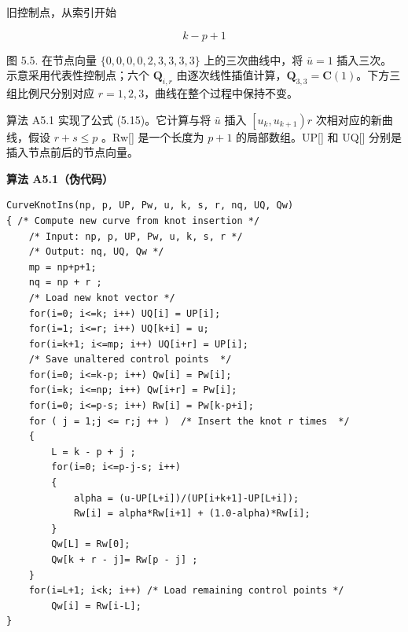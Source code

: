 \documentclass[../main.tex]{subfiles}
\begin{document}
旧控制点，从索引开始

\[
k - p + 1 \tag{5.18}
\]



\begin{center}
\begin{minipage}{18cm}
\vspace*{.6\baselineskip}
\centering
{}
\par\smallskip
图 5.5. 在节点向量 \(\{0,0,0,0,2,3,3,3,3\}\) 上的三次曲线中，将 \(\bar u=1\) 插入三次。示意采用代表性控制点；六个 \(\mathbf Q_{i,r}\) 由逐次线性插值计算，\(\mathbf Q_{3,3}=\mathbf C(1)\)。下方三组比例尺分别对应 \(r=1,2,3\)，曲线在整个过程中保持不变。
\end{minipage}
\end{center}

算法 A5.1 实现了公式 (5.15)。它计算与将 \(\bar{u}\) 插入 \(\left\lbrack  {{u}_{k},{u}_{k + 1}}\right) r\) 次相对应的新曲线，假设 \(r + s \leq  p\) 。Rw[] 是一个长度为 \(p + 1\) 的局部数组。UP[] 和 UQ[] 分别是插入节点前后的节点向量。

\par\medskip\noindent\textbf{算法 A5.1（伪代码）}\par
\begin{verbatim}
CurveKnotIns(np, p, UP, Pw, u, k, s, r, nq, UQ, Qw)
{ /* Compute new curve from knot insertion */
    /* Input: np, p, UP, Pw, u, k, s, r */
    /* Output: nq, UQ, Qw */
    mp = np+p+1;
    nq = np + r ;
    /* Load new knot vector */
    for(i=0; i<=k; i++) UQ[i] = UP[i];
    for(i=1; i<=r; i++) UQ[k+i] = u;
    for(i=k+1; i<=mp; i++) UQ[i+r] = UP[i];
    /* Save unaltered control points  */
    for(i=0; i<=k-p; i++) Qw[i] = Pw[i];
    for(i=k; i<=np; i++) Qw[i+r] = Pw[i];
    for(i=0; i<=p-s; i++) Rw[i] = Pw[k-p+i];
    for ( j = 1;j <= r;j ++ )  /* Insert the knot r times  */
    {
        L = k - p + j ;
        for(i=0; i<=p-j-s; i++)
        {
            alpha = (u-UP[L+i])/(UP[i+k+1]-UP[L+i]);
            Rw[i] = alpha*Rw[i+1] + (1.0-alpha)*Rw[i];
        }
        Qw[L] = Rw[0];
        Qw[k + r - j]= Rw[p - j] ;
    }
    for(i=L+1; i<k; i++) /* Load remaining control points */
        Qw[i] = Rw[i-L];
}
\end{verbatim}
\end{document}
